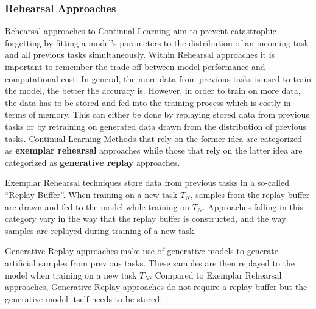 \subsubsection{Rehearsal Approaches}
\label{sec:RehearsalApproaches}
Rehearsal approaches to Continual Learning aim to prevent catastrophic forgetting by fitting a model's parameters to the distribution
of an incoming task and all previous tasks simultaneously. Within Rehearsal approaches it is important to remember the trade-off between
model performance and computational cost. In general, the more data from previous tasks is used to train the model, the better the accuracy is. 
However, in order to train on more data, the data has to be stored and fed into the training process which is costly in terms of memory.
This can either be done by replaying stored data from previous tasks or by
retraining on generated data drawn from the distribution of previous tasks. Continual Learning Methods that rely on the former idea are
categorized as \textbf{exemplar rehearsal} approaches while those that rely on the latter idea are categorized as \textbf{generative replay}
approaches. \par
Exemplar Rehearsal techniques store data from previous tasks in a so-called \enquote{Replay Buffer}. When training on a new task $T_N$, samples
from the replay buffer are drawn and fed to the model while training on $T_N$. Approaches falling in this category vary in the way that the replay
buffer is constructed, and the way samples are replayed during training of a new task. \par
Generative Replay approaches make use of generative models to generate artificial samples from previous tasks. These samples are then replayed to
the model when training on a new task $T_N$. Compared to Exemplar Rehearsal approaches, Generative Replay approaches do not require a replay buffer
but the generative model itself needs to be stored. 

